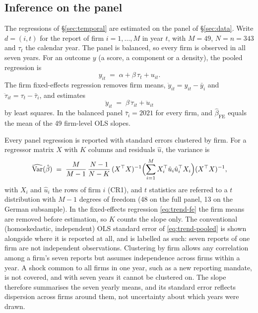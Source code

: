 \subsection{Inference on the panel}
\label{sec:index-inference}

The regressions of \S\ref{sec:temporal} are estimated on the panel of
\S\ref{sec:data}. Write $d = (i, t)$ for the report of firm $i = 1, \dots, M$
in year $t$, with $M = 49$, $N = n = 343$ and $\tau_t$ the calendar year. The
panel is balanced, so every firm is observed in all seven years.
For an outcome $y$ (a score, a component or a density), the pooled
regression is
\begin{equation}
\label{eq:trend-pooled}
y_{it} \;=\; \alpha + \beta\,\tau_t + u_{it}.
\end{equation}
The firm fixed-effects regression removes firm means,
$\ddot y_{it} = y_{it} - \bar y_{i}$ and
$\ddot\tau_{it} = \tau_t - \bar\tau_i$, and estimates
\begin{equation}
\label{eq:trend-fe}
\ddot y_{it} \;=\; \beta\,\ddot\tau_{it} + \ddot u_{it}
\end{equation}
by least squares. In the balanced panel $\bar\tau_i = 2021$ for every firm,
and $\hat\beta_{\mathrm{FE}}$ equals the mean of the 49 firm-level OLS slopes.

Every panel regression is reported with standard errors clustered by firm.
For a regressor matrix $X$ with $K$ columns and residuals $\hat u$, the
variance is
\begin{equation}
\label{eq:cluster-vcov}
\widehat{\mathrm{Var}}(\hat\beta) \;=\; \frac{M}{M-1}\,\frac{N-1}{N-K}\,
(X^{\top}X)^{-1}\Bigl(\sum_{i=1}^{M} X_i^{\top}\hat u_i \hat u_i^{\top} X_i\Bigr)
(X^{\top}X)^{-1},
\end{equation}
with $X_i$ and $\hat u_i$ the rows of firm $i$ (CR1), and $t$ statistics
are referred to a $t$ distribution with $M-1$ degrees of freedom (48 on the
full panel, 13 on the German subsample). In the fixed-effects regression
\eqref{eq:trend-fe} the firm means are removed before estimation, so $K$
counts the slope only. The conventional (homoskedastic, independent) OLS
standard error of \eqref{eq:trend-pooled} is shown alongside where it is
reported at all, and is labelled as such: seven reports of one firm are not
independent observations. Clustering by firm allows any correlation among a
firm's seven reports but assumes independence across firms within a year. A
shock common to all firms in one year, such as a new reporting mandate, is
not covered, and with seven years it cannot be clustered on. The slope
therefore summarises the seven yearly means, and its standard error
reflects dispersion across firms around them, not uncertainty about which
years were drawn.

